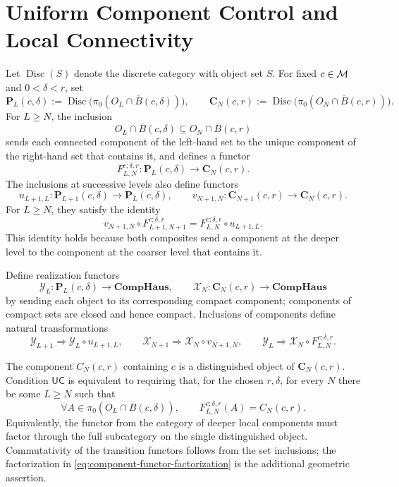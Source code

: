 \section{Uniform Component Control and Local Connectivity}

Let \(\operatorname{Disc}(S)\) denote the discrete category with object
set \(S\). For fixed \(c\in\mathcal M\) and \(0<\delta<r\), set
\[
 \mathbf P_L(c,\delta):=
 \operatorname{Disc}\bigl(\pi_0(O_L\cap\overline B(c,\delta))\bigr),
 \qquad
 \mathbf C_N(c,r):=
 \operatorname{Disc}\bigl(\pi_0(O_N\cap\overline B(c,r))\bigr).
\]
For \(L\ge N\), the inclusion
\[
 O_L\cap\overline B(c,\delta)
 \subseteq O_N\cap\overline B(c,r)
\]
sends each connected component of the left-hand set to the unique
component of the right-hand set that contains it, and defines a functor
\[
 F_{L,N}^{c;\delta,r}:
 \mathbf P_L(c,\delta)\longrightarrow\mathbf C_N(c,r).
\]
The inclusions at successive levels also define functors
\[
 u_{L+1,L}:\mathbf P_{L+1}(c,\delta)\to\mathbf P_L(c,\delta),
\qquad
 v_{N+1,N}:\mathbf C_{N+1}(c,r)\to\mathbf C_N(c,r).
\]
For \(L\ge N\), they satisfy the identity
\[
 v_{N+1,N}\circ F_{L+1,N+1}^{c;\delta,r}
 =
 F_{L,N}^{c;\delta,r}\circ u_{L+1,L}.
\]
This identity holds because both composites send a component at the
deeper level to the component at the coarser level that contains it.

Define realization functors
\[
 \mathcal Y_L:\mathbf P_L(c,\delta)\to\mathbf{CompHaus},
 \qquad
 \mathcal X_N:\mathbf C_N(c,r)\to\mathbf{CompHaus}
\]
by sending each object to its corresponding compact component;
components of compact sets are closed and hence compact. Inclusions of
components define natural transformations
\[
 \mathcal Y_{L+1}\Rightarrow\mathcal Y_L\circ u_{L+1,L},\qquad
 \mathcal X_{N+1}\Rightarrow\mathcal X_N\circ v_{N+1,N},\qquad
 \mathcal Y_L\Rightarrow\mathcal X_N\circ F_{L,N}^{c;\delta,r}.
\]

The component \(C_N(c,r)\) containing \(c\) is a distinguished object
of \(\mathbf C_N(c,r)\). Condition \(\mathsf{UC}\) is equivalent to
requiring that, for the chosen \(r,\delta\), for every \(N\) there be
some \(L\ge N\) such that
\begin{equation}
 \forall A\in\pi_0(O_L\cap\overline B(c,\delta)),\qquad
 F_{L,N}^{c;\delta,r}(A)=C_N(c,r).
 \label{eq:component-functor-factorization}
\end{equation}
Equivalently, the functor from the category of deeper local components
must factor through the full subcategory on the single distinguished
object. Commutativity of the transition functors follows from the set
inclusions; the factorization in
\eqref{eq:component-functor-factorization} is the additional geometric
assertion.

